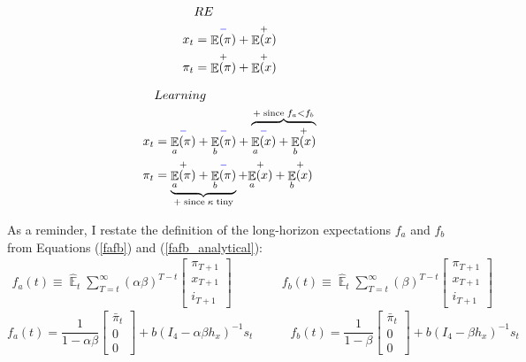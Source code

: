 \documentclass[11pt]{article}
\renewcommand{\[}{\begin{equation}}
\renewcommand{\]}{\end{equation}}
\DeclareMathOperator{\E}{\mathbb{E}}
\begin{document}
\vspace{-0.9cm}

\begin{multicols}{2}
\begin{align*}
& RE \\
x_t & = \overset{\textcolor{blue}{-}}{\E(\pi)} + \overset{+}{\E(x)} \\  
\pi_t & = \overset{+}{\E(\pi)} + \overset{+}{\E(x)} 
\end{align*}
\columnbreak

\vspace{0.1cm}

\begin{align*}
& Learning \\
x_t & = \overset{\textcolor{blue}{-}}{\E_a(\pi)}  + \overset{\textcolor{blue}{-}}{\E_b(\pi)}  
+ \overbrace{\overset{\textcolor{blue}{-}}{\E_a(x)}   + \overset{+}{\E_b(x)}}^{+ \; \text{since} \; f_a < f_b}   \\  
\pi_t & = \underbrace{\overset{+}{\E_a(\pi)} + \overset{\textcolor{blue}{-}}{\E_b(\pi)}}_{+ \; \text{since} \; \kappa \; \text{tiny}} 
+ \overset{+}{\E_a(x)} + \overset{+}{\E_b(x)}
\end{align*}
\end{multicols}

As a reminder, I restate the definition of the long-horizon expectations $f_a$ and $f_b$ from Equations (\ref{fafb}) and (\ref{fafb_analytical}):
\begin{align}
f_a(t)  \equiv  \hat{\E}_t\sum_{T=t}^{\infty} (\alpha\beta)^{T-t } \begin{bmatrix} \pi_{T+1} \\ x_{T+1} \\ i_{T+1} \end{bmatrix} \quad \quad \quad \quad f_b(t)  \equiv \hat{\E}_t\sum_{T=t}^{\infty} (\beta)^{T-t } \begin{bmatrix} \pi_{T+1} \\ x_{T+1} \\ i_{T+1} \end{bmatrix}
\end{align}
\begin{equation}
f_a(t) = \frac{1}{1-\alpha\beta}\begin{bmatrix} \bar{\pi}_t \\ 0 \\ 0 \end{bmatrix} + b(I_4 - \alpha\beta h_x)^{-1}s_t \quad \quad \quad f_b(t) = \frac{1}{1-\beta}\begin{bmatrix} \bar{\pi}_t \\ 0 \\ 0 \end{bmatrix}  + b(I_4 - \beta h_x)^{-1}s_t  \label{fafb_obvious}
\end{equation}
\end{document}
